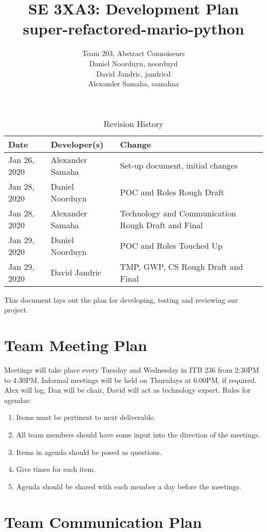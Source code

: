 \documentclass{article}
\title{SE 3XA3: Development Plan\\super-refactored-mario-python}
\author{Team 203, Abstract Connoiseurs\\
Daniel Noorduyn, noorduyd\\
David Jandric, jandricd\\
Alexander Samaha, samahaa\\
}
\date{}
\begin{document}
\begin{table}[hp]
\caption{Revision History} \label{TblRevisionHistory}
\begin{tabularx}{\textwidth}{llX}
\toprule
\textbf{Date} & \textbf{Developer(s)} & \textbf{Change}\\
\midrule
Jan 26, 2020 & Alexander Samaha & Set-up document, initial changes\\
Jan 28, 2020 & Daniel Noorduyn & POC and Roles Rough Draft\\
Jan 28, 2020 & Alexander Samaha & Technology and Communication Rough Draft and Final\\
Jan 29, 2020 & Daniel Noorduyn & POC and Roles Touched Up\\
Jan 29, 2020 & David Jandric & TMP, GWP, CS Rough Draft and Final\\
\bottomrule
\end{tabularx}
\end{table}

\newpage

\maketitle

This document lays out the plan for developing, testing and reviewing our
project.

\section{Team Meeting Plan}

Meetings will take place every Tuesday and Wednesday in ITB 236 from 2:30PM to
4:30PM. Informal meetings will be held on Thursdays at 6:00PM, if required.
Alex will log, Dan will be chair, David will act as technology expert.
Rules for agendas:
\begin{enumerate}
    \item Items must be pertinent to next deliverable.
    \item All team members should have some input into the direction of the meetings.
    \item Items in agenda should be posed as questions.
    \item Give times for each item.
    \item Agenda should be shared with each member a day before the meetings.
\end{enumerate}

\section{Team Communication Plan}
\end{document}
